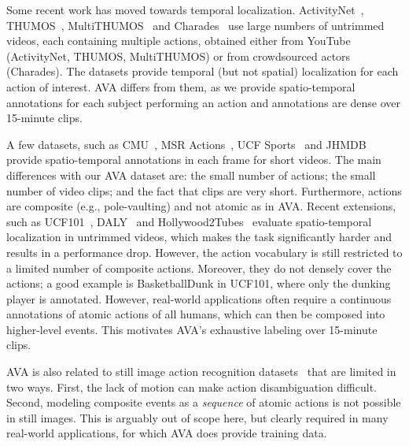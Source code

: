 \documentclass[10pt,twocolumn,letterpaper]{article}
\begin{document}
Some recent work has moved towards temporal localization. ActivityNet~\cite{activitynet}, THUMOS~\cite{THUMOS}, MultiTHUMOS~\cite{MultiTHUMOS} and Charades~\cite{charades2016} use large numbers of untrimmed videos, each containing multiple actions, obtained either from YouTube (ActivityNet, THUMOS, MultiTHUMOS) or from crowdsourced actors (Charades). The datasets provide temporal (but not spatial) localization for each action of interest.  AVA differs from them, as we provide spatio-temporal annotations for each subject performing an action and annotations are dense over 15-minute clips. 

A few datasets, such as CMU~\cite{Ke2005}, MSR Actions~\cite{Yuan2009}, UCF Sports~\cite{ucfsports} and JHMDB~\cite{jhmdb} provide spatio-temporal annotations in each frame for short videos. The main differences with our AVA dataset are: the small number of actions; the small number of video clips; and the fact that clips are very short. Furthermore, actions are composite (e.g., pole-vaulting) and not atomic as in AVA. Recent extensions, such as UCF101~\cite{ucf101}, DALY~\cite{weinzaepfel2016} and Hollywood2Tubes~\cite{mettes2016} evaluate spatio-temporal localization in untrimmed videos, which makes the task significantly harder and results in a performance drop. However, the action vocabulary is still restricted to a limited number of composite actions. Moreover, they do not densely cover the actions; a good example is BasketballDunk in UCF101, where only the dunking player is annotated. However, real-world applications often require a continuous annotations of atomic actions of all humans, which can then be composed into higher-level events. This motivates AVA's exhaustive labeling over 15-minute clips.

AVA is also related to still image action recognition datasets~\cite{hico2015,PASCAL,gupta2015} that are limited in two ways. First, the lack of motion can make action disambiguation difficult. Second, modeling composite events as a \emph{sequence} of atomic actions is not possible in still images. This is arguably out of scope here, but clearly required in many real-world applications, for which AVA does provide training data.
\end{document}
